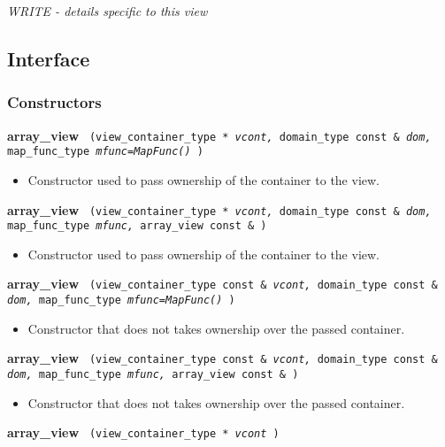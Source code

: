\textit{WRITE - details specific to this view}

\subsection{Interface} \label{sec-ary-vw-inter}

\subsubsection{Constructors}

\noindent
\textbf{array\_view}%
\texttt{%
(view\_container\_type *
\textit{vcont,}%
domain\_type const \&
\textit{dom,}%
map\_func\_type
\textit{mfunc=MapFunc()}%
)
}

\begin{itemize}
\item
Constructor used to pass ownership of the container to the view.
\end{itemize}

\noindent
\textbf{array\_view}%
\texttt{%
(view\_container\_type *
\textit{vcont,}%
domain\_type const \&
\textit{dom,}%
map\_func\_type
\textit{mfunc,}%
array\_view const \&
)
}

\begin{itemize}
\item
Constructor used to pass ownership of the container to the view.
\end{itemize}

\noindent
\textbf{array\_view}%
\texttt{%
(view\_container\_type const \&
\textit{vcont,}%
domain\_type const \&
\textit{dom,}%
map\_func\_type
\textit{mfunc=MapFunc()}%
)
}

\begin{itemize}
\item
Constructor that does not takes ownership over the passed container.
\end{itemize}

\noindent
\textbf{array\_view}%
\texttt{%
(view\_container\_type const \&
\textit{vcont,}%
domain\_type const \&
\textit{dom,}%
map\_func\_type
\textit{mfunc,}%
array\_view const \&
)
}

\begin{itemize}
\item
Constructor that does not takes ownership over the passed container.
\end{itemize}

\noindent
\textbf{array\_view}%
\texttt{%
(view\_container\_type *
\textit{vcont}%
)
}

